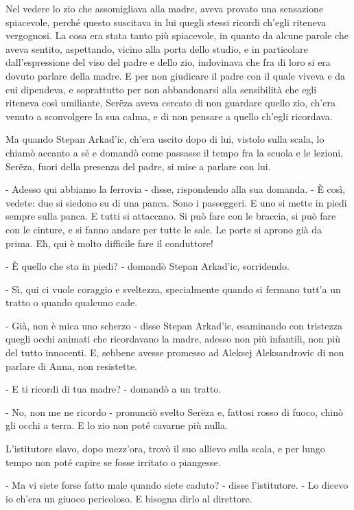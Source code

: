 Nel vedere lo zio che assomigliava alla madre, aveva provato una sensazione spiacevole, perché questo suscitava in lui quegli stessi ricordi ch'egli riteneva vergognosi. La cosa era stata tanto più spiacevole, in quanto da alcune parole che aveva sentito, aspettando, vicino alla porta dello studio, e in particolare dall'espressione del viso del padre e dello zio, indovinava che fra di loro si era dovuto parlare della madre. E per non giudicare il padre con il quale viveva e da cui dipendeva, e soprattutto per non abbandonarsi alla sensibilità che egli riteneva così umiliante, Serëza aveva cercato di non guardare quello zio, ch'era venuto a sconvolgere la sua calma, e di non pensare a quello ch'egli ricordava. 

Ma quando Stepan Arkad'ic, ch'era uscito dopo di lui, vistolo sulla scala, lo chiamò accanto a sé e domandò come passasse il tempo fra la scuola e le lezioni, Serëza, fuori della presenza del padre, si mise a parlare con lui. 

- Adesso qui abbiamo la ferrovia - disse, rispondendo alla sua domanda. - È così, vedete: due si siedono su di una panca. Sono i passeggeri. E uno si mette in piedi sempre sulla panca. E tutti si attaccano. Si può fare con le braccia, si può fare con le cinture, e si fanno andare per tutte le sale. Le porte si aprono già da prima. Eh, qui è molto difficile fare il conduttore! 

- È quello che sta in piedi? - domandò Stepan Arkad'ic, sorridendo. 

- Sì, qui ci vuole coraggio e sveltezza, specialmente quando si fermano tutt'a un tratto o quando qualcuno cade. 

- Già, non è mica uno scherzo - disse Stepan Arkad'ic, esaminando con tristezza quegli occhi animati che ricordavano la madre, adesso non più infantili, non più del tutto innocenti. E, sebbene avesse promesso ad Aleksej Aleksandrovic di non parlare di Anna, non resistette. 

- E ti ricordi di tua madre? - domandò a un tratto. 

- No, non me ne ricordo - pronunciò svelto Serëza e, fattosi rosso di fuoco, chinò gli occhi a terra. E lo zio non poté cavarne più nulla. 

L'istitutore slavo, dopo mezz'ora, trovò il suo allievo sulla scala, e per lungo tempo non poté capire se fosse irritato o piangesse. 

- Ma vi siete forse fatto male quando siete caduto? - disse l'istitutore. - Lo dicevo io ch'era un giuoco pericoloso. E bisogna dirlo al direttore. 

